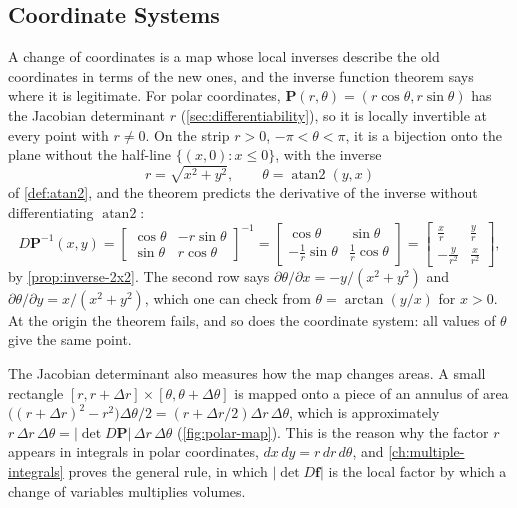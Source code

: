 \subsection{Coordinate Systems}

A change of coordinates is a map whose local inverses describe the old coordinates in terms of the new ones, and the inverse function theorem says where it is legitimate. For polar coordinates, $\mathbf P(r,\theta)=(r\cos\theta,r\sin\theta)$ has the Jacobian determinant $r$ (\cref{sec:differentiability}), so it is locally invertible at every point with $r\ne0$. On the strip $r>0$, $-\pi<\theta<\pi$, it is a bijection onto the plane without the half-line $\{(x,0): x\le0\}$, with the inverse
\[
r=\sqrt{x^2+y^2},\qquad\theta=\operatorname{atan2}(y,x)
\]
of \cref{def:atan2}, and the theorem predicts the derivative of the inverse without differentiating $\operatorname{atan2}$:
\[
D\mathbf P^{-1}(x,y)=\begin{bmatrix}\cos\theta&-r\sin\theta\\\sin\theta&r\cos\theta\end{bmatrix}^{-1}=\begin{bmatrix}\cos\theta&\sin\theta\\-\frac1r\sin\theta&\frac1r\cos\theta\end{bmatrix}=\begin{bmatrix}\frac xr&\frac yr\\-\frac y{r^2}&\frac x{r^2}\end{bmatrix},
\]
by \cref{prop:inverse-2x2}. The second row says $\partial\theta/\partial x=-y/(x^2+y^2)$ and $\partial\theta/\partial y=x/(x^2+y^2)$, which one can check from $\theta=\arctan(y/x)$ for $x>0$. At the origin the theorem fails, and so does the coordinate system: all values of $\theta$ give the same point.

The Jacobian determinant also measures how the map changes areas. A small rectangle $[r,r+\Delta r]\times[\theta,\theta+\Delta\theta]$ is mapped onto a piece of an annulus of area $\bigl((r+\Delta r)^2-r^2\bigr)\Delta\theta/2=(r+\Delta r/2)\Delta r\,\Delta\theta$, which is approximately $r\,\Delta r\,\Delta\theta=|\det D\mathbf P|\,\Delta r\,\Delta\theta$ (\cref{fig:polar-map}). This is the reason why the factor $r$ appears in integrals in polar coordinates, $dx\,dy=r\,dr\,d\theta$, and \cref{ch:multiple-integrals} proves the general rule, in which $|\det D\mathbf f|$ is the local factor by which a change of variables multiplies volumes.

